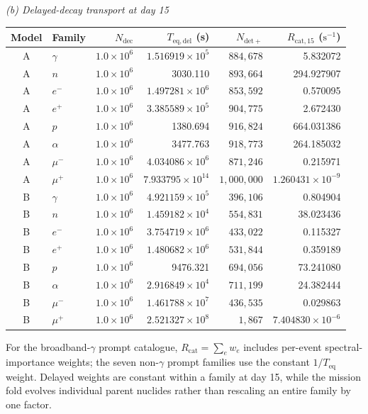 \documentclass[11pt]{article}
\begin{document}
\begin{table}[!htbp]
\vspace{0.45em}
\noindent\textit{(b) Delayed-decay transport at day 15}\par\vspace{0.20em}
\begin{tabular}{clrrrr}
\toprule
Model & Family & $N_{\mathrm{dec}}$ & $T_{\mathrm{eq,del}}$ (s)
& $N_{\mathrm{det+}}$ & $R_{\mathrm{cat},15}$ ($\mathrm{s^{-1}}$) \\
\midrule
A & $\gamma$ & $1.0\times10^6$ & $1.516919\times10^5$ & $884{,}678$ & 5.832072 \\
A & $n$ & $1.0\times10^6$ & 3030.110 & $893{,}664$ & 294.927907 \\
A & $e^-$ & $1.0\times10^6$ & $1.497281\times10^6$ & $853{,}592$ & 0.570095 \\
A & $e^+$ & $1.0\times10^6$ & $3.385589\times10^5$ & $904{,}775$ & 2.672430 \\
A & $p$ & $1.0\times10^6$ & 1380.694 & $916{,}824$ & 664.031386 \\
A & $\alpha$ & $1.0\times10^6$ & 3477.763 & $918{,}773$ & 264.185032 \\
A & $\mu^-$ & $1.0\times10^6$ & $4.034086\times10^6$ & $871{,}246$ & 0.215971 \\
A & $\mu^+$ & $1.0\times10^6$ & $7.933795\times10^{14}$ & $1{,}000{,}000$ & $1.260431\times10^{-9}$ \\
\addlinespace[0.25em]
B & $\gamma$ & $1.0\times10^6$ & $4.921159\times10^5$ & $396{,}106$ & 0.804904 \\
B & $n$ & $1.0\times10^6$ & $1.459182\times10^4$ & $554{,}831$ & 38.023436 \\
B & $e^-$ & $1.0\times10^6$ & $3.754719\times10^6$ & $433{,}022$ & 0.115327 \\
B & $e^+$ & $1.0\times10^6$ & $1.480682\times10^6$ & $531{,}844$ & 0.359189 \\
B & $p$ & $1.0\times10^6$ & 9476.321 & $694{,}056$ & 73.241080 \\
B & $\alpha$ & $1.0\times10^6$ & $2.916849\times10^4$ & $711{,}199$ & 24.382444 \\
B & $\mu^-$ & $1.0\times10^6$ & $1.461788\times10^7$ & $436{,}535$ & 0.029863 \\
B & $\mu^+$ & $1.0\times10^6$ & $2.521327\times10^8$ & $1{,}867$ & $7.404830\times10^{-6}$ \\
\bottomrule
\end{tabular}

\vspace{0.35em}
\parbox{0.97\linewidth}{\raggedright For the broadband-$\gamma$ prompt
catalogue, $R_{\mathrm{cat}}=\sum_e w_e$ includes per-event spectral-importance
weights; the seven non-$\gamma$ prompt families use the constant
$1/T_{\mathrm{eq}}$ weight. Delayed weights are constant within a family at day
15, while the mission fold evolves individual parent nuclides rather than
rescaling an entire family by one factor.}
\end{table}
\endgroup
\end{document}
